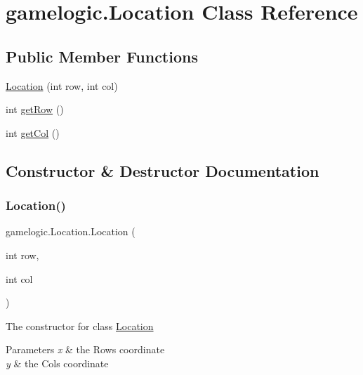 \hypertarget{classgamelogic_1_1_location}{}\section{gamelogic.\+Location Class Reference}
\label{classgamelogic_1_1_location}
\subsection*{Public Member Functions}
\begin{DoxyCompactItemize}
\item 
\mbox{\hyperlink{classgamelogic_1_1_location_ad89bb2c011cbde7816b66ba9aeb08aef}{Location}} (int row, int col)
\item 
int \mbox{\hyperlink{classgamelogic_1_1_location_a2f7ffddb0a19205378c67bc745bedc83}{get\+Row}} ()
\item 
int \mbox{\hyperlink{classgamelogic_1_1_location_aea6fd7274810050fc0d2b46805c85d6f}{get\+Col}} ()
\end{DoxyCompactItemize}


\subsection{Constructor \& Destructor Documentation}
\mbox{\label{classgamelogic_1_1_location_ad89bb2c011cbde7816b66ba9aeb08aef}} 
\subsubsection{\texorpdfstring{Location()}{Location()}}
{\footnotesize\ttfamily gamelogic.\+Location.\+Location (\begin{DoxyParamCaption}\item[{int}]{row,  }\item[{int}]{col }\end{DoxyParamCaption})}

The constructor for class \mbox{\hyperlink{classgamelogic_1_1_location}{Location}} 
\begin{DoxyParams}{Parameters}
{\em x} & the Row\textquotesingle{}s coordinate \\
\hline
{\em y} & the Col\textquotesingle{}s coordinate \\
\hline
\end{DoxyParams}


